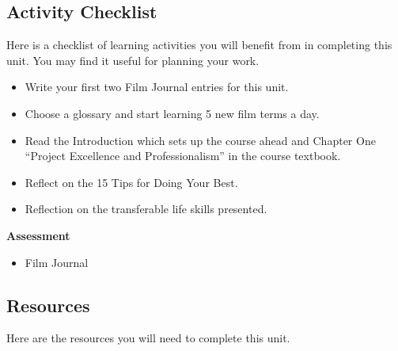 \documentclass[
]{book}
\providecommand{\tightlist}{%
  \setlength{\itemsep}{0pt}\setlength{\parskip}{0pt}}
\begin{document}
\hypertarget{activity-checklist}{%
\subsection*{Activity Checklist}\label{activity-checklist}}

\begin{reflect}
Here is a checklist of learning activities you will benefit from in completing this unit. You may find it useful for planning your work.

\begin{itemize}
\tightlist
\item
  Write your first two Film Journal entries for this unit.\\
\item
  Choose a glossary and start learning 5 new film terms a day.\\
\item
  Read the Introduction which sets up the course ahead and Chapter One ``Project Excellence and Professionalism'' in the course textbook.\\
\item
  Reflect on the 15 Tips for Doing Your Best.\\
\item
  Reflection on the transferable life skills presented.
\end{itemize}

\textbf{Assessment}

\begin{itemize}
\tightlist
\item
  Film Journal
\end{itemize}
\end{reflect}

\hypertarget{resources}{%
\subsection*{Resources}\label{resources}}

Here are the resources you will need to complete this unit.
\end{document}
